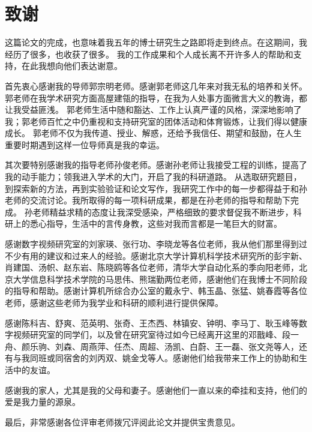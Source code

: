 \chapter{致谢}

这篇论文的完成，也意味着我五年的博士研究生之路即将走到终点。在这期间，我经历了很多，也收获了很多。
我的工作成果和个人成长离不开许多人的帮助和支持，在此我想向他们表达谢意。

首先衷心感谢我的导师郭宗明老师。感谢郭老师这几年来对我无私的培养和关怀。郭老师在我学术研究方面高屋建瓴的指导，在我为人处事方面微言大义的教诲，都让我受益匪浅。
郭老师生活中随和豁达、工作上认真严谨的风格，深深地影响了我；郭老师百忙之中仍重视和支持研究室的团体活动和体育锻炼，让我们得以健康成长。
郭老师不仅为我传道、授业、解惑，还给予我信任、期望和鼓励，在人生重要时期遇到这样一位导师真是我的幸运。

其次要特别感谢我的指导老师孙俊老师。感谢孙老师让我接受工程的训练，提高了我的动手能力；领我进入学术的大门，开启了我的科研道路。
从选取研究题目，到探索新的方法，再到实验验证和论文写作，我研究工作中的每一步都得益于和孙老师的交流讨论。我所取得的每一项科研成果，都是在孙老师的指导和帮助下完成。
孙老师精益求精的态度让我深受感染，严格细致的要求督促我不断进步，科研上的悉心指导，生活中的言传身教，这些对我而言都是一笔巨大的财富。

感谢数字视频研究室的刘家瑛、张行功、李晓龙等各位老师，我从他们那里得到过不少有用的建议和过来人的经验。感谢北京大学计算机科学技术研究所的彭宇新、肖建国、汤帜、赵东岩、陈晓鸥等各位老师，清华大学自动化系的季向阳老师，北京大学信息科学技术学院的马思伟、熊瑞勤两位老师，感谢他们在我博士不同阶段的指导和帮助。感谢计算机所综合办公室的戴永宁、韩玉晶、张猛、姚春霞等各位老师，感谢这些老师为我学业和科研的顺利进行提供保障。

感谢陈科吉、舒爽、范英明、张奇、王杰西、林镇安、钟明、李马丁、耿玉峰等数字视频研究室的同学们，以及曾在研究室待过如今已经离开这里的邓戬峰、段一舟、颜乐驹、刘森、周燕萍、任杰、周超、汤凯、白蔚、王一磊、张文尧等人，还有与我同班或同宿舍的刘丙双、姚金戈等人。感谢他们给我带来工作上的协助和生活中的友谊。

感谢我的家人，尤其是我的父母和妻子。感谢他们一直以来的牵挂和支持，他们的爱是我力量的源泉。

最后，非常感谢各位评审老师拨冗评阅此论文并提供宝贵意见。